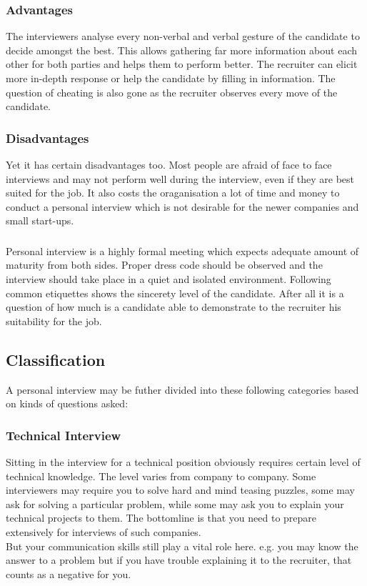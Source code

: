 \documentclass[a4paper,12pt]{report}
\begin{document}
\subsubsection{Advantages}
The interviewers analyse every non-verbal
and verbal gesture of the candidate to decide amongst the best. This allows gathering far more information
about each other for both parties and helps them to perform better. The recruiter can elicit more in-depth response
or help the candidate by filling in information. The question of cheating is also gone as the recruiter observes every move
of the candidate.
\subsubsection{Disadvantages}
Yet it has certain disadvantages too. Most people are afraid of face to face interviews and may not perform well
during the interview, even if they are best suited for the job. It also costs the oraganisation a lot of time and
money to conduct a personal interview which is not desirable for the newer companies and small start-ups.
\subsubsection{}
Personal interview is a highly formal meeting which expects adequate amount of  maturity from both sides.
Proper dress code should be observed and the interview should take place in a quiet and isolated environment.
Following common etiquettes shows the sincerety level of the candidate. After all it is a question of how much 
is a candidate able to demonstrate to the recruiter his suitability for the job.
\subsection{Classification}
A personal interview may be futher divided into these following categories based on kinds of questions asked:
\subsubsection{Technical Interview}
Sitting in the interview for a technical position obviously requires certain level of technical knowledge. The level
varies from company to company. Some interviewers may require you to solve hard and mind teasing puzzles, some may ask 
for solving a particular problem, while some may ask you to explain your technical projects to them. The bottomline is
that you need to prepare extensively for interviews of such companies. \\But your communication skills still
play a vital role here. e.g. you may know the answer to a problem but if you have trouble explaining it to the
recruiter, that counts as a negative for you. 
\end{document}
